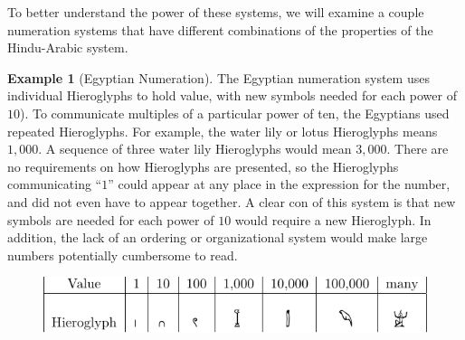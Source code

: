 \documentclass[
]{book}
\theoremstyle{definition}
\theoremstyle{definition}
\newtheorem{example}{Example}[chapter]
\theoremstyle{definition}
\theoremstyle{definition}
\theoremstyle{remark}
\begin{document}
To better understand the power of these systems, we will examine a couple numeration systems that have different combinations of the properties of the Hindu-Arabic system.

\begin{example}[Egyptian Numeration]

The Egyptian numeration system uses individual Hieroglyphs to hold value, with new symbols needed for each power of \(10\)). To communicate multiples of a particular power of ten, the Egyptians used repeated Hieroglyphs. For example, the water lily or lotus Hieroglyphs means \(1,000\). A sequence of three water lily Hieroglyphs would mean \(3,000\). There are no requirements on how Hieroglyphs are presented, so the Hieroglyphs communicating ``\(1\)'' could appear at any place in the expression for the number, and did not even have to appear together. A clear con of this system is that new symbols are needed for each power of \(10\) would require a new Hieroglyph. In addition, the lack of an ordering or organizational system would make large numbers potentially cumbersome to read.

\begin{figure}

{\centering \includegraphics[width=0.9\linewidth]{tikz/hieroglyphs} 

}

\end{figure}

\end{example}
\end{document}
